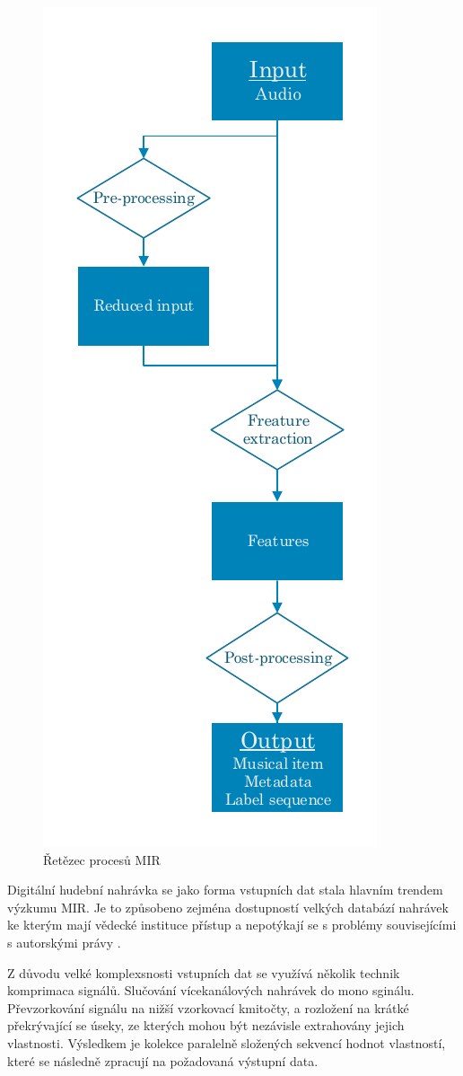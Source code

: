 \begin{figure}[H]
    \centering
    \includegraphics[width = 0.4\linewidth]{obrazky/MIR-diagram.pdf}
    \caption{Řetězec procesů MIR \cite{a_new_companion_to_digital_humanities}}
    \label{fig:MIR_diagram}
\end{figure}

    Digitální hudební nahrávka se jako forma vstupních dat stala hlavním trendem výzkumu \acs{MIR}.
    Je to způsobeno zejména dostupností velkých databází nahrávek ke kterým mají vědecké instituce přístup a nepotýkají se s problémy souvisejícími s autorskými právy \cite{a_new_companion_to_digital_humanities}.

    Z důvodu velké komplexsnosti vstupních dat se využívá několik technik komprimaca signálů. 
    Slučování vícekanálových nahrávek do mono sginálu. Převzorkování signálu na nižší vzorkovací kmitočty,
    a rozložení na krátké překrývající se úseky, ze kterých mohou být nezávisle extrahovány jejich vlastnosti\cite{lidy09:448[TUW-181186]}. 
    Výsledkem je kolekce paralelně složených sekvencí hodnot vlastností, které se následně zpracují na požadovaná výstupní data.

